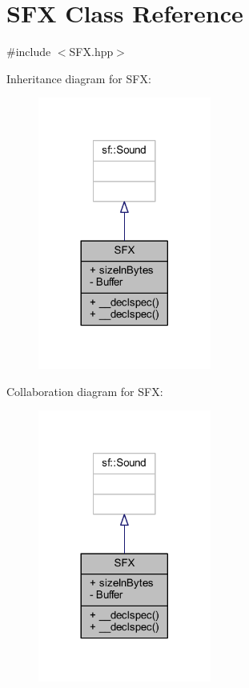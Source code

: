 \hypertarget{class_s_f_x}{\section{S\-F\-X Class Reference}
\label{class_s_f_x}
}


{\ttfamily \#include $<$S\-F\-X.\-hpp$>$}



Inheritance diagram for S\-F\-X\-:\nopagebreak
\begin{figure}[H]
\begin{center}
\leavevmode
\includegraphics[width=161pt]{class_s_f_x__inherit__graph}
\end{center}
\end{figure}


Collaboration diagram for S\-F\-X\-:\nopagebreak
\begin{figure}[H]
\begin{center}
\leavevmode
\includegraphics[width=161pt]{class_s_f_x__coll__graph}
\end{center}
\end{figure}
